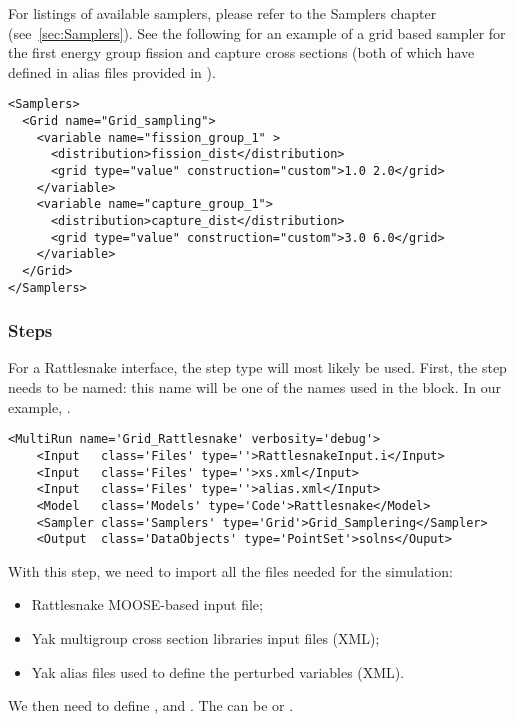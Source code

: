 For listings of available samplers, please refer to the Samplers chapter (see~\ref{sec:Samplers}).
See the following for an example of a grid based sampler for
the first energy group fission and capture cross sections  (both of which have
defined in alias files provided in ).

\begin{lstlisting}[style=XML]
<Samplers>
  <Grid name="Grid_sampling">
    <variable name="fission_group_1" >
      <distribution>fission_dist</distribution>
      <grid type="value" construction="custom">1.0 2.0</grid>
    </variable>
    <variable name="capture_group_1">
      <distribution>capture_dist</distribution>
      <grid type="value" construction="custom">3.0 6.0</grid>
    </variable>
  </Grid>
</Samplers>
\end{lstlisting}

\subsubsection{Steps}
For a Rattlesnake interface, the  step type will most likely be used. First, the step needs
to be named: this name will be one of the names used in the  block. In our example, .
%
\begin{lstlisting}[style=XML]
<MultiRun name='Grid_Rattlesnake' verbosity='debug'>
    <Input   class='Files' type=''>RattlesnakeInput.i</Input>
    <Input   class='Files' type=''>xs.xml</Input>
    <Input   class='Files' type=''>alias.xml</Input>
    <Model   class='Models' type='Code'>Rattlesnake</Model>
    <Sampler class='Samplers' type='Grid'>Grid_Samplering</Sampler>
    <Output  class='DataObjects' type='PointSet'>solns</Ouput>
\end{lstlisting}
%
With this step, we need to import all the files needed for the simulation:
%
\begin{itemize}
  \item Rattlesnake MOOSE-based input file;
  \item Yak multigroup cross section libraries input files (XML);
  \item Yak alias files used to define the perturbed variables (XML).
\end{itemize}
We then need to define ,  and . The  can be
 or .

